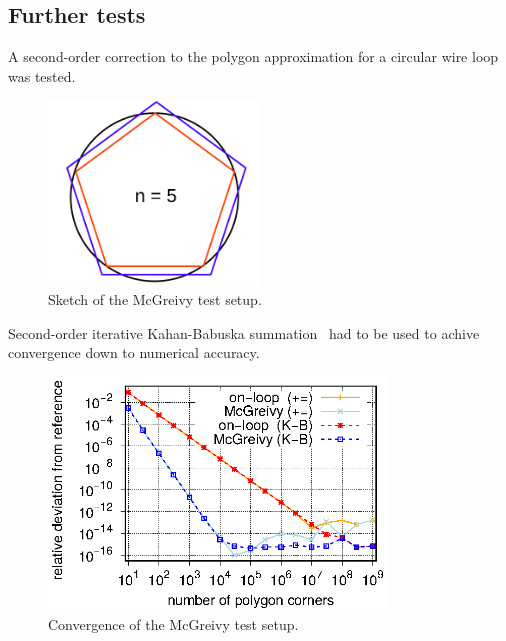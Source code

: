 \subsection{Further tests}

A second-order correction to the polygon approximation
for a circular wire loop~\cite{mcgreivy_2021} was tested.
\begin{figure}[htbp]
 \centering
 \includegraphics[width=0.5\textwidth]{img/sketch_McGreivy.png}
 \caption{Sketch of the McGreivy test setup.}
 \label{fig:sketch_McGreivy}
\end{figure}
Second-order iterative Kahan-Babuska summation~\cite{klein_2006} had to be used
to achive convergence down to numerical accuracy.
\begin{figure}[htbp]
 \centering
 \includegraphics[width=0.8\textwidth]{img/McGreivy_convergence_2.eps}
 \caption{Convergence of the McGreivy test setup.}
 \label{fig:McGreivy_convergence_2}
\end{figure}
